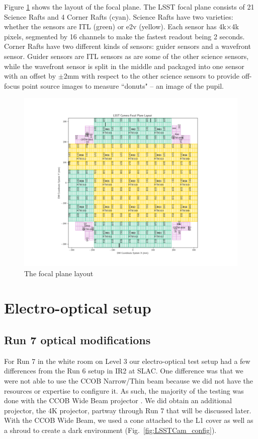 Figure \ref{fig:focal-plane-layout} shows the layout of the focal plane. The LSST focal plane consists of 21 Science Rafts and 4 Corner Rafts (cyan). Science Rafts have two varieties: whether the sensors are ITL (green) or e2v (yellow). Each sensor has 4k$\times$4k pixels, segmented by 16 channels to make the fastest readout being 2 seconds. Corner Rafts have two different kinds of sensors: guider sensors and a wavefront sensor. Guider sensors are ITL sensors as are some of the other science sensors, while the wavefront sensor is split in the middle and packaged into one sensor with an offset by $\pm2$mm with respect to the other science sensors to provide off-focus point source images to measure ``donuts" -- an image of the pupil.
\begin{figure}
    \centering
    \includegraphics[width=1.0\linewidth]{figures/introduction/LSSTCam_fp_layout_Oct2024.pdf}
    \caption{The focal plane layout}
    \label{fig:focal-plane-layout}
\end{figure}

\section{Electro-optical setup}\label{electro-optical-setup}

\subsection{Run 7 optical modifications}\label{run-7-optical-modifications}

For Run 7 in the white room on Level 3 our electro-optical test setup had a few differences from the Run 6 setup in IR2 at SLAC. One difference was that we were not able to use the CCOB Narrow/Thin beam because we did not have the resources or expertise to configure it. As
such, the majority of the testing was done with the CCOB Wide Beam
projector \citep{2024SPIE13103E..0WU}. We did obtain an additional projector, the 4K projector, partway through Run 7 that will be discussed later. With the CCOB Wide Beam,
we used a cone attached to the L1 cover as well as a shroud to create a
dark environment (Fig.~\ref{fig:LSSTCam_config}).

